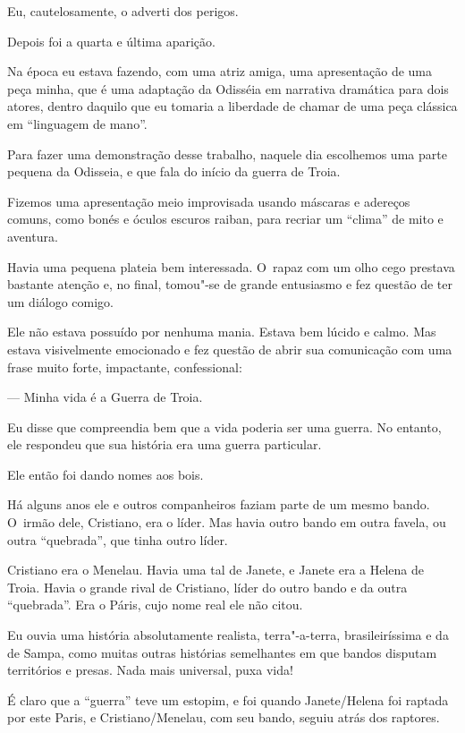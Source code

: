 Eu, cautelosamente, o adverti dos perigos.

\asterisc{}

Depois foi a quarta e última aparição.

Na época eu estava fazendo, com uma atriz amiga, uma apresentação de uma
peça minha, que é uma adaptação da Odisséia em narrativa dramática para
dois atores, dentro daquilo que eu tomaria a liberdade de chamar de uma
peça clássica em ``linguagem de mano''.

Para fazer uma demonstração desse trabalho, naquele dia escolhemos uma
parte pequena da Odisseia, e que fala do início da guerra de Troia.

Fizemos uma apresentação meio improvisada usando máscaras e adereços
comuns, como bonés e óculos escuros raiban, para recriar um ``clima'' de
mito e aventura.

Havia uma pequena plateia bem interessada. O~rapaz com um olho cego
prestava bastante atenção e, no final, tomou"-se de grande entusiasmo e
fez questão de ter um diálogo comigo.

Ele não estava possuído por nenhuma mania. Estava bem lúcido e calmo.
Mas estava visivelmente emocionado e fez questão de abrir sua
comunicação com uma frase muito forte, impactante, confessional:

— Minha vida é a Guerra de Troia.

Eu disse que compreendia bem que a vida poderia ser uma guerra. No
entanto, ele respondeu que sua história era uma guerra particular.

Ele então foi dando nomes aos bois.

Há alguns anos ele e outros companheiros faziam parte de um mesmo bando.
O~irmão dele, Cristiano, era o líder. Mas havia outro bando em outra
favela, ou outra ``quebrada'', que tinha outro líder.

Cristiano era o Menelau. Havia uma tal de Janete, e Janete era a Helena
de Troia. Havia o grande rival de Cristiano, líder do outro bando e da
outra ``quebrada''. Era o Páris, cujo nome real ele não citou.

Eu ouvia uma história absolutamente realista, terra"-a-terra,
brasileiríssima e da  de Sampa, como muitas outras histórias
semelhantes em que bandos disputam territórios e presas. Nada mais
universal, puxa vida!

É claro que a ``guerra'' teve um estopim, e foi quando Janete/Helena foi
raptada por este Paris, e Cristiano/Menelau, com seu bando, seguiu atrás
dos raptores.

